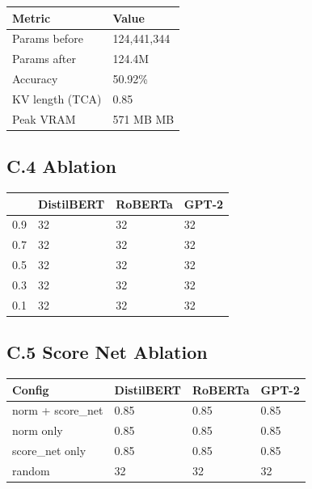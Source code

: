\begin{table}[H]
\centering
\small
\begin{tabular}{ll}
\toprule
\textbf{Metric} & \textbf{Value} \\
\midrule
Params before & 124,441,344 \\
Params after & 124.4M \\
Accuracy & 50.92\% \\
KV length (TCA) & 0.85 \\
Peak VRAM & 571 MB MB \\
\bottomrule
\end{tabular}
\end{table}

\subsection{C.4   Ablation}

\begin{table}[H]
\centering
\small
\begin{tabular}{llll}
\toprule
\textbf{} & \textbf{DistilBERT} & \textbf{RoBERTa} & \textbf{GPT-2} \\
\midrule
0.9 & 32 & 32 & 32 \\
0.7 & 32 & 32 & 32 \\
0.5 & 32 & 32 & 32 \\
0.3 & 32 & 32 & 32 \\
0.1 & 32 & 32 & 32 \\
\bottomrule
\end{tabular}
\end{table}

\subsection{C.5 Score Net Ablation}

\begin{table}[H]
\centering
\small
\begin{tabular}{llll}
\toprule
\textbf{Config} & \textbf{DistilBERT} & \textbf{RoBERTa} & \textbf{GPT-2} \\
\midrule
norm + score\_net & 0.85 & 0.85 & 0.85 \\
norm only & 0.85 & 0.85 & 0.85 \\
score\_net only & 0.85 & 0.85 & 0.85 \\
random & 32 & 32 & 32 \\
\bottomrule
\end{tabular}
\end{table}

